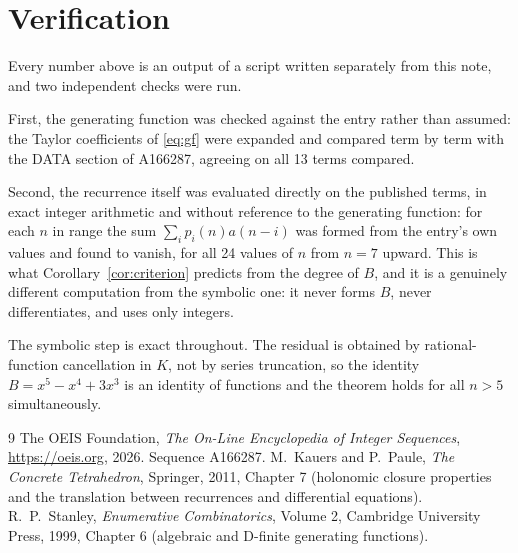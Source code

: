 \documentclass[11pt,a4paper]{article}
\theoremstyle{plain}
\theoremstyle{definition}
\begin{document}
\section{Verification}

Every number above is an output of a script written separately from this note, and two
independent checks were run.

First, the generating function was checked against the entry rather than assumed: the
Taylor coefficients of \eqref{eq:gf} were expanded and compared term by term with the DATA
section of A166287, agreeing on all 13 terms compared.

Second, the recurrence itself was evaluated directly on the published terms, in exact
integer arithmetic and without reference to the generating function: for each $n$ in range
the sum $\sum_{i}p_{i}(n)a(n-i)$ was formed from the entry's own values and found to
vanish, for all 24 values of $n$ from $n=7$ upward. This is what
Corollary~\ref{cor:criterion} predicts from the degree of $B$, and it is a genuinely
different computation from the symbolic one: it never forms $B$, never differentiates, and
uses only integers.

The symbolic step is exact throughout. The residual is obtained by rational-function
cancellation in $K$, not by series truncation, so the identity $B=x^{5} - x^{4} + 3 x^{3}$ is an
identity of functions and the theorem holds for all $n>5$ simultaneously.

\begin{thebibliography}{9}
 The OEIS Foundation, \emph{The On-Line Encyclopedia of Integer Sequences},
\url{https://oeis.org}, 2026. Sequence A166287.
 M.~Kauers and P.~Paule, \emph{The Concrete Tetrahedron}, Springer, 2011,
Chapter 7 (holonomic closure properties and the translation between recurrences and
differential equations).
 R.~P.~Stanley, \emph{Enumerative Combinatorics}, Volume 2, Cambridge
University Press, 1999, Chapter 6 (algebraic and D-finite generating functions).
\end{thebibliography}
\end{document}

